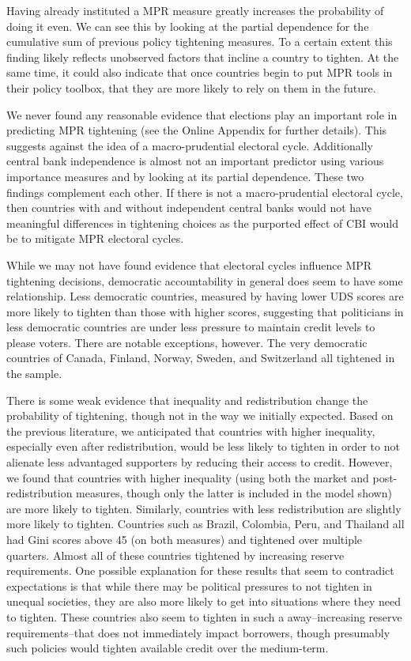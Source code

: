 \documentclass[]{article}
\begin{document}
Having already instituted a MPR measure greatly increases the
probability of doing it even. We can see this by looking at the partial
dependence for the cumulative sum of previous policy tightening
measures. To a certain extent this finding likely reflects unobserved
factors that incline a country to tighten. At the same time, it could
also indicate that once countries begin to put MPR tools in their policy
toolbox, that they are more likely to rely on them in the future.

We never found any reasonable evidence that elections play an important
role in predicting MPR tightening (see the Online Appendix for further
details). This suggests against the idea of a macro-prudential electoral
cycle. Additionally central bank independence is almost not an important
predictor using various importance measures and by looking at its
partial dependence. These two findings complement each other. If there
is not a macro-prudential electoral cycle, then countries with and
without independent central banks would not have meaningful differences
in tightening choices as the purported effect of CBI would be to
mitigate MPR electoral cycles.

While we may not have found evidence that electoral cycles influence MPR
tightening decisions, democratic accountability in general does seem to
have some relationship. Less democratic countries, measured by having
lower UDS scores are more likely to tighten than those with higher
scores, suggesting that politicians in less democratic countries are
under less pressure to maintain credit levels to please voters. There
are notable exceptions, however. The very democratic countries of
Canada, Finland, Norway, Sweden, and Switzerland all tightened in the
sample.

There is some weak evidence that inequality and redistribution change
the probability of tightening, though not in the way we initially
expected. Based on the previous literature, we anticipated that
countries with higher inequality, especially even after redistribution,
would be less likely to tighten in order to not alienate less advantaged
supporters by reducing their access to credit. However, we found that
countries with higher inequality (using both the market and
post-redistribution measures, though only the latter is included in the
model shown) are more likely to tighten. Similarly, countries with less
redistribution are slightly more likely to tighten. Countries such as
Brazil, Colombia, Peru, and Thailand all had Gini scores above 45 (on
both measures) and tightened over multiple quarters. Almost all of these
countries tightened by increasing reserve requirements. One possible
explanation for these results that seem to contradict expectations is
that while there may be political pressures to not tighten in unequal
societies, they are also more likely to get into situations where they
need to tighten. These countries also seem to tighten in such a
away--increasing reserve requirements--that does not immediately impact
borrowers, though presumably such policies would tighten available
credit over the medium-term.
\end{document}
